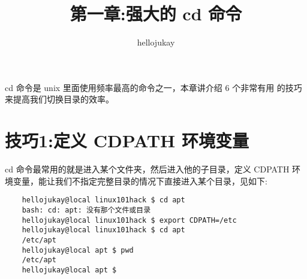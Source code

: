 \documentclass[UTF8]{ctexart}
\title{第一章:强大的 cd 命令}
\author{hellojukay}
\begin{document}
\maketitle
cd 命令是 unix 里面使用频率最高的命令之一，本章讲介绍 6 个非常有用
的技巧来提高我们切换目录的效率。

\section*{技巧1:定义 CDPATH 环境变量}
cd 命令最常用的就是进入某个文件夹，然后进入他的子目录，定义 CDPATH 环
境变量，能让我们不指定完整目录的情况下直接进入某个目录，见如下:
\begin{lstlisting}
    hellojukay@local linux101hack $ cd apt
    bash: cd: apt: 没有那个文件或目录
    hellojukay@local linux101hack $ export CDPATH=/etc
    hellojukay@local linux101hack $ cd apt
    /etc/apt
    hellojukay@local apt $ pwd
    /etc/apt
    hellojukay@local apt $ 
\end{lstlisting}
\end{document}
